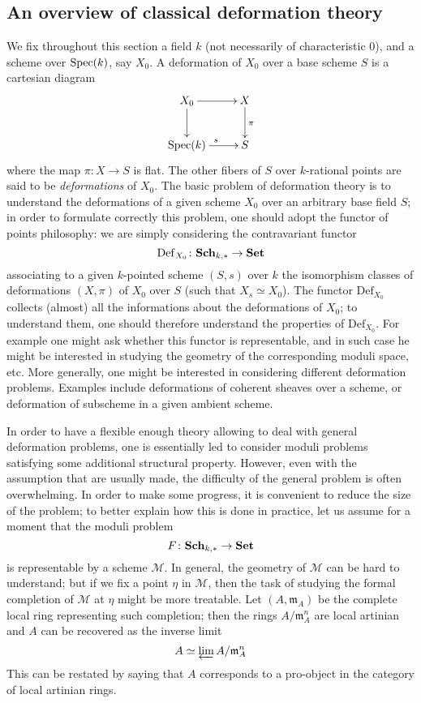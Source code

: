 \begin{refsection}
\subsection{An overview of classical deformation theory}

We fix throughout this section a field $k$ (not necessarily of characteristic $0$), and a scheme over $\mathrm{Spec}(k)$, say $X_0$. A deformation of $X_0$ over a base scheme $S$ is a cartesian diagram
\[
\xymatrix{
X_0 \ar[d] \ar[r] & X \ar[d]^\pi \\ \spec(k) \ar[r]^s & S
}
\]
where the map $\pi \colon X \to S$ is flat. The other fibers of $S$ over $k$-rational points are said to be \emph{deformations} of $X_0$. The basic problem of deformation theory is to understand the deformations of a given scheme $X_0$ over an arbitrary base field $S$; in order to formulate correctly this problem, one should adopt the functor of points philosophy: we are simply considering the contravariant functor
\[
\mathrm{Def}_{X_0} \colon \mathbf{Sch}_{k,*} \to \mathbf{Set}
\]
associating to a given $k$-pointed scheme $(S,s)$ over $k$ the isomorphism classes of deformations $(X,\pi)$ of $X_0$ over $S$ (such that $X_s \simeq X_0$). The functor $\mathrm{Def}_{X_0}$ collects (almost) all the informations about the deformations of $X_0$; to understand them, one should therefore understand the properties of $\mathrm{Def}_{X_0}$. For example one might ask whether this functor is representable, and in such case he might be interested in studying the geometry of the corresponding moduli space, etc. More generally, one might be interested in considering different deformation problems. Examples include deformations of coherent sheaves over a scheme, or deformation of subscheme in a given ambient scheme.

In order to have a flexible enough theory allowing to deal with general deformation problems, one is essentially led to consider moduli problems satisfying some additional structural property. However, even with the assumption that are usually made, the difficulty of the general problem is often overwhelming. In order to make some progress, it is convenient to reduce the size of the problem; to better explain how this is done in practice, let us assume for a moment that the moduli problem
\[
F \colon \mathbf{Sch}_{k,*} \to \mathbf{Set}
\]
is representable by a scheme $\mathcal M$. In general, the geometry of $\mathcal M$ can be hard to understand; but if we fix a point $\eta$ in $\mathcal M$, then the task of studying the formal completion of $\mathcal M$ at $\eta$ might be more treatable. Let $(A,\mathfrak m_A)$ be the complete local ring representing such completion; then the rings $A / \mathfrak m_A^n$ are local artinian and $A$ can be recovered as the inverse limit
\[
A \simeq \varprojlim A / \mathfrak m_A^n
\]
This can be restated by saying that $A$ corresponds to a pro-object in the category of local artinian rings.


\end{refsection}
